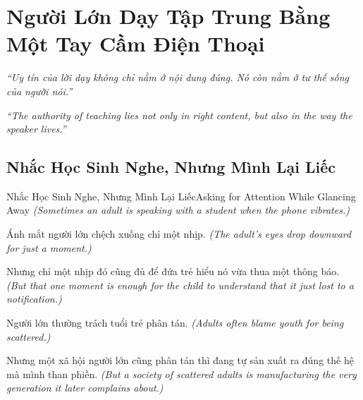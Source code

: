 \chapter{Người Lớn Dạy Tập Trung Bằng Một Tay Cầm Điện Thoại}

\begin{center}
	\textit{\color{bookprimary}``Uy tín của lời dạy không chỉ nằm ở nội dung đúng. Nó còn nằm ở tư thế sống của người nói.''}

	\textit{\color{bookprimary}``The authority of teaching lies not only in right content, but also in the way the speaker lives.''}
\end{center}

\ngancach

\section{Nhắc Học Sinh Nghe, Nhưng Mình Lại Liếc}
\begin{truyen}{Nhắc Học Sinh Nghe, Nhưng Mình Lại Liếc}{Asking for Attention While Glancing Away}
\textit{(Sometimes an adult is speaking with a student when the phone vibrates.)}

Ánh mắt người lớn chệch xuống chỉ một nhịp.
\textit{(The adult's eyes drop downward for just a moment.)}

Nhưng chỉ một nhịp đó cũng đủ để đứa trẻ hiểu nó vừa thua một thông báo.
\textit{(But that one moment is enough for the child to understand that it just lost to a notification.)}


Người lớn thường trách tuổi trẻ phân tán.
\textit{(Adults often blame youth for being scattered.)}

Nhưng một xã hội người lớn cũng phân tán thì đang tự sản xuất ra đúng thế hệ mà mình than phiền.
\textit{(But a society of scattered adults is manufacturing the very generation it later complains about.)}
\end{truyen}

